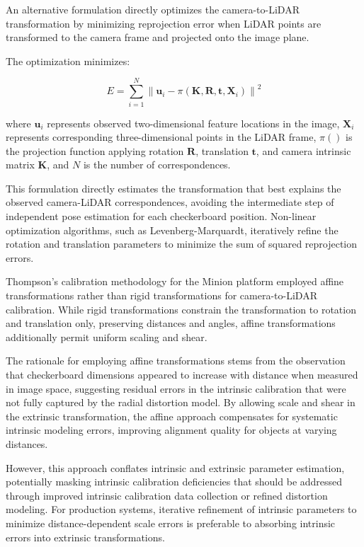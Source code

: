 
An alternative formulation directly optimizes the camera-to-LiDAR transformation by minimizing reprojection error when LiDAR points are transformed to the camera frame and projected onto the image plane.

The optimization minimizes:

\begin{equation}
    E = \sum_{i=1}^{N} \left\| \mathbf{u}_i - \pi(\mathbf{K}, \mathbf{R}, \mathbf{t}, \mathbf{X}_i) \right\|^2
\end{equation}


where $\mathbf{u}_i$ represents observed two-dimensional feature locations in the image, $\mathbf{X}_i$ represents corresponding three-dimensional points in the LiDAR frame, $\pi()$ is the projection function applying rotation $\mathbf{R}$, translation $\mathbf{t}$, and camera intrinsic matrix $\mathbf{K}$, and $N$ is the number of correspondences.

This formulation directly estimates the transformation that best explains the observed camera-LiDAR correspondences, avoiding the intermediate step of independent pose estimation for each checkerboard position.
Non-linear optimization algorithms, such as Levenberg-Marquardt, iteratively refine the rotation and translation parameters to minimize the sum of squared reprojection errors.


Thompson's calibration methodology for the Minion platform employed affine transformations rather than rigid transformations for camera-to-LiDAR calibration.
While rigid transformations constrain the transformation to rotation and translation only, preserving distances and angles, affine transformations additionally permit uniform scaling and shear.

The rationale for employing affine transformations stems from the observation that checkerboard dimensions appeared to increase with distance when measured in image space, suggesting residual errors in the intrinsic calibration that were not fully captured by the radial distortion model.
By allowing scale and shear in the extrinsic transformation, the affine approach compensates for systematic intrinsic modeling errors, improving alignment quality for objects at varying distances.

However, this approach conflates intrinsic and extrinsic parameter estimation, potentially masking intrinsic calibration deficiencies that should be addressed through improved intrinsic calibration data collection or refined distortion modeling.
For production systems, iterative refinement of intrinsic parameters to minimize distance-dependent scale errors is preferable to absorbing intrinsic errors into extrinsic transformations.

